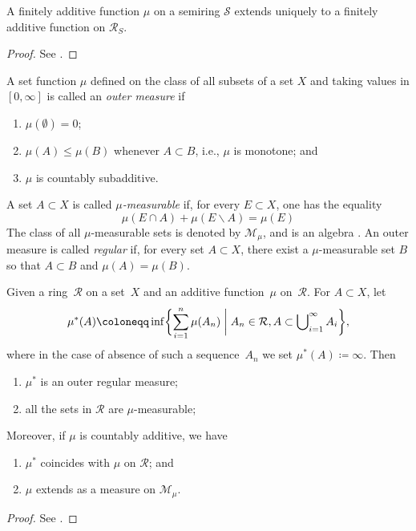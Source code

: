 \begin{proposition}
A finitely additive function $\mu$ on a semiring $\mathcal{S}$ extends
uniquely to a finitely additive function on $\mathcal{R}_{S}$.
\label{prop:addsemitoring}
\end{proposition}
\begin{proof}
See \cite[1.3.10~Proposition]{Bo07:MeasureTheory}.
\end{proof}


\begin{definition}
\label{def:outermeasure}
A set function $\mu$ defined on the class of all subsets of a set $X$ and taking values in $[0,\infty]$ is called an \emph{outer measure} if 
\begin{enumerate}
    \item $\mu(\emptyset)=0$;
    \item $\mu(A) \leq \mu(B)$ whenever $A \subset B$, i.e., $\mu$ is
      monotone; and
    \item $\mu$ is countably subadditive. 
\end{enumerate}
A set $A \subset X$ is called \emph{$\mu$-measurable} if, for every $E
\subset X$, one has the equality
\[
\mu(E \cap A) + \mu(E \backslash A) = \mu(E)
\]
The class of all $\mu$-measurable sets is denoted by $\mathcal{M}_{\mu}$, and is an algebra \cite[Theorem~1.11.4]{Bo07:MeasureTheory}.
An outer measure is called \emph{regular} if, for every set $A \subset X$, there exist a $\mu$-measurable set $B$ so that $A \subset B$ and $\mu(A)=\mu(B)$.
\end{definition}

\begin{theorem}
Given a ring~$\mathcal{R}$ on a set~$X$ and an additive function~$\mu$ on~$\mathcal{R}$.
For $A \subset X$, let 
\[
\mu^*(A) \coloneqq \inf \biggl\{ \sum_{i=1}^n \mu(A_n) \biggm\vert A_n \in \mathcal{R}, A \subset \bigcup\nolimits_{i=1}^{\infty} A_i\biggr\},
\]
where in the case of absence of such a sequence~$A_n$ we set $\mu^*(A)
\coloneqq \infty$. Then
\begin{enumerate}
    \item $\mu^*$ is an outer regular measure;
    \item all the sets in $\mathcal{R}$ are $\mu$-measurable;
\end{enumerate}
Moreover, if $\mu$ is countably additive, we have
\begin{enumerate}
\item $\mu^*$ coincides with $\mu$ on $\mathcal{R}$; and
    \item $\mu$ extends as a measure on $\mathcal{M}_{\mu}$.
\end{enumerate}
\label{thm:caratheodory}
\end{theorem}
\begin{proof}
See \cite[1.11.8~Theorem]{Bo07:MeasureTheory}.
\end{proof}


